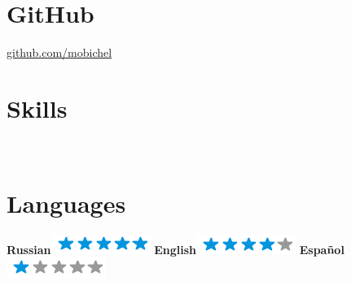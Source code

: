\documentclass[]{friggeri-cv}
\begin{document}
\begin{aside}
  \section{GitHub}
    \href{https://github.com/mobichel}{github.com/mobichel}
    ~
    \section{Skills}
    ~
    \section{Languages}
        \textbf{Russian}\includegraphics[scale=0.40]{img/5stars.png}
        \textbf{English}\includegraphics[scale=0.40]{img/4stars.png}
        \textbf{Español}\includegraphics[scale=0.40]{img/1stars.png}
    ~
\end{aside}
~
\end{document}
